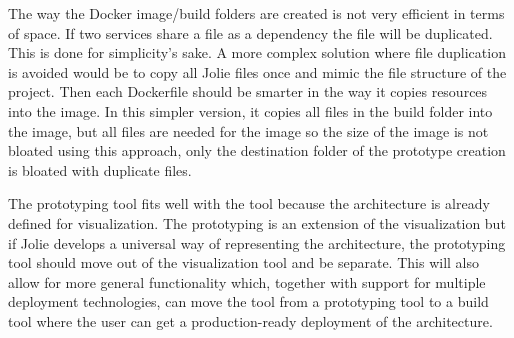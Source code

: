 The way the Docker image/build folders are created is not very efficient in terms of space. If two services share a file as a dependency the file will be duplicated.
This is done for simplicity's sake. A more complex solution where file duplication is avoided would be to copy all Jolie files once and mimic the file structure of the project. 
Then each Dockerfile should be smarter in the way it copies resources into the image. In this simpler version, it copies all files in the build folder into the image, but all files are needed for the image so the size of the image is not bloated using this approach, only the destination folder of the prototype creation is bloated with duplicate files.

The prototyping tool fits well with the tool because the architecture is already defined for visualization.
The prototyping is an extension of the visualization but if Jolie develops a universal way of representing the architecture, the prototyping tool should move out of the visualization tool and be separate.
This will also allow for more general functionality which, together with support for multiple deployment technologies, can move the tool from a prototyping tool to a build tool where the user can get a production-ready deployment of the architecture.